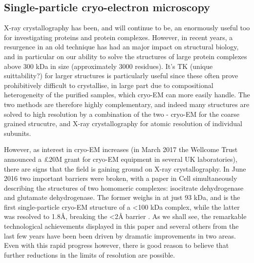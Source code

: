 \documentclass[a4paper,11pt,twoside,openright]{scrbook}
\let\cite\supercite
\begin{document}

\subsection{Single-particle cryo-electron microscopy}

X-ray crystallography has been, and will continue to be, an enormously useful too for investigating proteins and protein complexes. However, in recent years, a resurgence in an old technique has had an major impact on structural biology, and in particular on our ability to solve the structures of large protein complexes above 300 kDa in size (approximately 3000 residues). It's TK (unique suittability?) for larger structures is particularly useful since these often prove prohibitively difficult to crystallise, in large part due to compositional heterogeneity of the purified samples, which cryo-EM can more easily handle. The two methods are therefore highly complementary, and indeed many structures are solved to high resolution by a combination of the two - cryo-EM for the coarse grained strucutre, and X-ray crystallography for atomic resolution of individual subunits.

However, as interest in cryo-EM increases (in March 2017 the Wellcome Trust announced a £20M grant for cryo-EM equipment in several UK laboratories), there are signs that the field is gaining ground on X-ray crystallography. In June 2016 two important barriers were broken, with a paper in Cell simultaneously describing the structures of two homomeric complexes: isocitrate dehydrogenase and glutamate dehydrogenase. The former weighs in at just 93 kDa, and is the first single-particle cryo-EM structure of a <100 kDa complex, while the latter was resolved to 1.8Å, breaking the <2Å barrier \cite{Merk2016}. As we shall see, the remarkable technological achievements displayed in this paper and several others from the last few years have been been driven by dramatic improvements in two areas\cite{Bai2015}. Even with this rapid progress however, there is good reason to believe that further reductions in the limits of resolution are possible.

\end{document}
